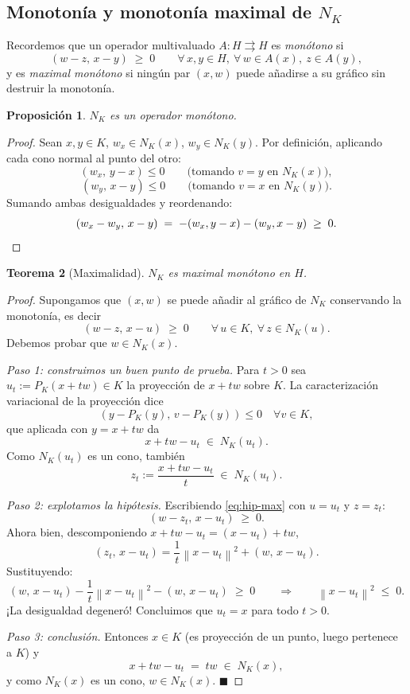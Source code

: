 \documentclass[11pt,a4paper]{article}
\newtheorem{teorema}{Teorema}[section]
\newtheorem{proposicion}[teorema]{Proposición}
\theoremstyle{definition}
\theoremstyle{remark}
\newcommand{\Norm}[1]{\left\lVert #1 \right\rVert}
\newcommand{\pk}{P_K}
\begin{document}
\subsection{Monotonía y monotonía maximal de $N_K$}

Recordemos que un operador multivaluado $A : H \rightrightarrows H$ es
\emph{monótono} si
\[
(w - z,\, x - y) \;\ge\; 0
\qquad \forall\, x, y \in H,\ \forall\, w \in A(x),\ z \in A(y),
\]
y es \emph{maximal monótono} si ningún par $(x,w)$ puede añadirse a su
gráfico sin destruir la monotonía.

\begin{proposicion}\label{prop:monotono}
$N_K$ es un operador monótono.
\end{proposicion}

\begin{proof}
Sean $x, y \in K$, $w_x \in N_K(x)$, $w_y \in N_K(y)$. Por definición,
aplicando cada cono normal al punto del otro:
\[
(w_x,\, y - x) \le 0
\qquad\text{(tomando } v = y \text{ en } N_K(x)\text{)},
\]
\[
(w_y,\, x - y) \le 0
\qquad\text{(tomando } v = x \text{ en } N_K(y)\text{)}.
\]
Sumando ambas desigualdades y reordenando:
\[
(w_x - w_y,\, x - y) \;=\; -(w_x, y - x) - (w_y, x - y) \;\ge\; 0. \qedhere
\]
\end{proof}

\begin{teorema}[Maximalidad]\label{thm:maximal}
$N_K$ es maximal monótono en $H$.
\end{teorema}

\begin{proof}
Supongamos que $(x, w)$ se puede añadir al gráfico de $N_K$ conservando la
monotonía, es decir
\begin{equation}\label{eq:hip-max}
(w - z,\, x - u) \;\ge\; 0
\qquad \forall\, u \in K,\ \forall\, z \in N_K(u).
\end{equation}
Debemos probar que $w \in N_K(x)$.

\emph{Paso 1: construimos un buen punto de prueba.}
Para $t > 0$ sea $u_t := \pk(x + t w) \in K$ la proyección de $x + t w$
sobre $K$. La caracterización variacional de la proyección dice
\[
(y - \pk(y),\, v - \pk(y)) \le 0 \quad \forall v \in K,
\]
que aplicada con $y = x + t w$ da
\[
x + t w - u_t \;\in\; N_K(u_t).
\]
Como $N_K(u_t)$ es un cono, también
\[
z_t := \frac{x + t w - u_t}{t} \;\in\; N_K(u_t).
\]

\emph{Paso 2: explotamos la hipótesis.}
Escribiendo \eqref{eq:hip-max} con $u = u_t$ y $z = z_t$:
\[
(w - z_t,\, x - u_t) \;\ge\; 0.
\]
Ahora bien, descomponiendo $x + t w - u_t = (x - u_t) + t w$,
\[
(z_t,\, x - u_t)
= \frac{1}{t}\Norm{x - u_t}^2 + (w,\, x - u_t).
\]
Sustituyendo:
\[
(w,\, x - u_t) - \frac{1}{t}\Norm{x - u_t}^2 - (w,\, x - u_t) \;\ge\; 0
\qquad\Longrightarrow\qquad
\Norm{x - u_t}^2 \;\le\; 0.
\]
¡La desigualdad degeneró! Concluimos que $u_t = x$ para todo $t > 0$.

\emph{Paso 3: conclusión.}
Entonces $x \in K$ (es proyección de un punto, luego pertenece a $K$) y
\[
x + t w - u_t \;=\; t w \;\in\; N_K(x),
\]
y como $N_K(x)$ es un cono, $w \in N_K(x)$. $\blacksquare$
\end{proof}
\end{document}
